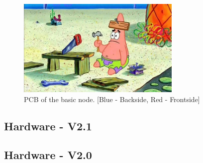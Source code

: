     \begin{figure}[H]
        \centering
        \includegraphics[width=0.7\textwidth]{assets/HW/TBD.png}
        \caption{PCB of the basic node. [Blue - Backside, Red - Frontside]}
    \end{figure}	


\subsection{Hardware - V2.1}

\subsection{Hardware - V2.0}

        